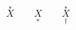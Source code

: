 \documentclass[nofonts]{ctexbook}
\begin{document}
\[
	\overset{*}{X}	\qquad
	\underset{*}{X}	\qquad
	\overset{*}{\underset{\dag}{X}}
\]
\end{document}
